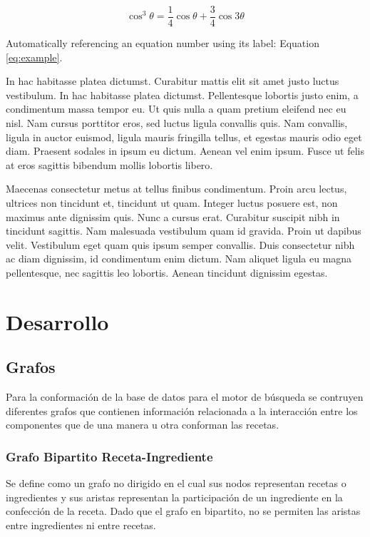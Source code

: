 \documentclass[
	a4paper, %
	10pt, %
	unnumberedsections, %
	twoside, %
]{LTJournalArticle}
\begin{document}
\begin{equation}
	\cos^3 \theta =\frac{1}{4}\cos\theta+\frac{3}{4}\cos 3\theta
	\label{eq:example}
\end{equation}

Automatically referencing an equation number using its label: Equation \ref{eq:example}.

In hac habitasse platea dictumst. Curabitur mattis elit sit amet justo luctus vestibulum. In hac habitasse platea dictumst. Pellentesque lobortis justo enim, a condimentum massa tempor eu. Ut quis nulla a quam pretium eleifend nec eu nisl. Nam cursus porttitor eros, sed luctus ligula convallis quis. Nam convallis, ligula in auctor euismod, ligula mauris fringilla tellus, et egestas mauris odio eget diam. Praesent sodales in ipsum eu dictum. Aenean vel enim ipsum. Fusce ut felis at eros sagittis bibendum mollis lobortis libero.

Maecenas consectetur metus at tellus finibus condimentum. Proin arcu lectus, ultrices non tincidunt et, tincidunt ut quam. Integer luctus posuere est, non maximus ante dignissim quis. Nunc a cursus erat. Curabitur suscipit nibh in tincidunt sagittis. Nam malesuada vestibulum quam id gravida. Proin ut dapibus velit. Vestibulum eget quam quis ipsum semper convallis. Duis consectetur nibh ac diam dignissim, id condimentum enim dictum. Nam aliquet ligula eu magna pellentesque, nec sagittis leo lobortis. Aenean tincidunt dignissim egestas.


\section{Desarrollo}

\subsection{Grafos}

Para la conformación de la base de datos para el motor de búsqueda se contruyen diferentes grafos que
contienen información relacionada a la interacción entre los componentes que de una manera u otra conforman
las recetas.

\subsubsection{Grafo Bipartito Receta-Ingrediente}

Se define como un grafo no dirigido en el cual sus nodos representan
recetas o ingredientes y sus aristas representan la participación de un ingrediente en la confección de la receta.
Dado que el grafo en bipartito, no se permiten las aristas entre ingredientes ni entre recetas.
\end{document}
